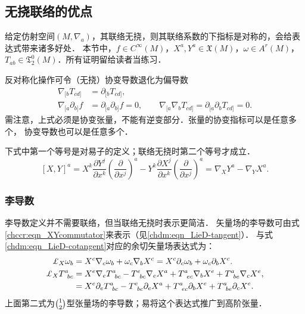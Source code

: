 \subsection{无挠联络的优点}\label{chccr:sec_eqn-Nalba}
给定仿射空间$(M,\nabla_a)$，其联络无挠，则其联络系数的下指标是对称的，会给表达式带来诸多好处．
本节中，$f\in C^\infty(M)$，$X^a,Y^a\in \mathfrak{X}(M)$，$\omega \in A^r(M)$，
$T_{ab} \in \mathfrak{T}^0_2(M)$．所有证明留给读者当练习．

反对称化操作可令（无挠）协变导数退化为偏导数
\begin{align}
    \nabla_{[b}T_{cd]} &= \partial_{[b}T_{cd]}, \label{chccr:eqn_anti-covD-parD1}\\
    \nabla_{[a}\partial_{b]}f &= \partial_{[a}\partial_{b]}f=0, \qquad
    \nabla_{[a}\nabla_{b}T_{cd]} = \partial_{[a}\partial_{b}T_{cd]}=0. \label{chccr:eqn_anti-covD-parD2}
\end{align}
需注意，上式必须是协变张量，不能有逆变部分．张量的协变指标可以是任意多个，
协变导数也可以是任意多个．



下式中第一个等号是对易子的定义；联络无挠时第二个等号才成立．
\begin{equation}\label{chccr:eqn_XYcommutator}
    \left[ {X,Y} \right]^a = {X^k}\frac{{\partial {Y^j}}}{{\partial {x^k}}}
    {\left( {\frac{\partial }{{\partial {x^j}}}} \right)^a} -
    {Y^k}\frac{{\partial {X^j}}}{{\partial {x^k}}}{\left( {\frac{\partial }{{\partial {x^j}}}} \right)^a}
    = \nabla_X Y^a - \nabla_Y X^a .
\end{equation}



\subsubsection{李导数}\label{chccr:sec_LieD-Nabla}
李导数定义并不需要联络，但当联络无挠时表示更简洁．
矢量场的李导数可由式\eqref{chccr:eqn_XYcommutator}来表示（见\eqref{chdm:eqn_LieD-tangent}）．
与式\eqref{chdm:eqn_LieD-cotangent}对应的余切矢量场表达式为：
\begin{align}
    \Lie_{X} \omega_{b} &= X^c\nabla_c \omega_{b} +  \omega_{c} \nabla_b X^c
     =X^c\partial_c \omega_{b} + \omega_{c} \partial_b X^c . \label{chccr:eqn_LieD-cotangent-Nabla} \\
    \Lie_{X} T^{a}_{\hphantom{a} bc} &= X^e\nabla_e T^{a}_{\hphantom{a} bc}
    - T^{e}_{\hphantom{a} bc} \nabla_e X^a + T^{a}_{\hphantom{a} ec} \nabla_b X^e
    + T^{a}_{\hphantom{a} be} \nabla_c X^e ,  \label{chccr:eqn_LieD-tensor-Nabla} \\
    &= X^e\partial_e T^{a}_{\hphantom{a} bc}
    - T^{e}_{\hphantom{a} bc} \partial_e X^a + T^{a}_{\hphantom{a} ec} \partial_b X^e
    + T^{a}_{\hphantom{a} be} \partial_c X^e .  \label{chccr:eqn_LieD-tensor-Partial}
\end{align}
上面第二式为$\binom{1}{2}$型张量场的李导数；易将这个表达式推广到高阶张量．

